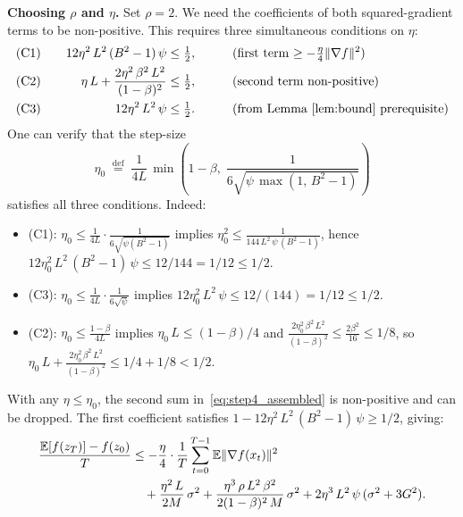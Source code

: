 \documentclass{article}
\begin{document}
\medskip
\noindent\textbf{Choosing $\rho$ and $\eta$.}
Set $\rho = 2$. We need the coefficients of both squared-gradient terms to be
non-positive. This requires three simultaneous conditions on $\eta$:
\begin{alignat}{3}
&\text{(C1)}\quad& 12\eta^2\,L^2\,(B^2-1)\,\psi &\leq \tfrac{1}{2},
  &\qquad& \text{(first term $\geq -\tfrac{\eta}{4}\|\nabla f\|^2$)} \notag\\
&\text{(C2)}\quad& \eta\,L + \frac{2\eta^2\,\beta^2\,L^2}{(1-\beta)^2}
  &\leq \tfrac{1}{2},
  &\qquad& \text{(second term non-positive)} \notag\\
&\text{(C3)}\quad& 12\eta^2\,L^2\,\psi &\leq \tfrac{1}{2}.
  &\qquad& \text{(from Lemma~\ref{lem:bound} prerequisite)}
\label{eq:three_conditions}
\end{alignat}
One can verify that the step-size
\begin{equation}
\eta_0 \;\stackrel{\text{def}}{=}\;
\frac{1}{4L}\,\min\!\left(1 - \beta,\;
\frac{1}{6\sqrt{\psi\,\max(1,\,B^2-1)}}\right)
\label{eq:eta0}
\end{equation}
satisfies all three conditions. Indeed:
\begin{itemize}
\item (C1): $\eta_0 \leq \frac{1}{4L}\cdot\frac{1}{6\sqrt{\psi(B^2-1)}}$
  implies $\eta_0^2 \leq \frac{1}{144\,L^2\,\psi\,(B^2-1)}$,
  hence $12\eta_0^2\,L^2\,(B^2-1)\,\psi \leq 12/144 = 1/12 \leq 1/2$.
\item (C3): $\eta_0 \leq \frac{1}{4L}\cdot\frac{1}{6\sqrt{\psi}}$
  implies $12\eta_0^2\,L^2\,\psi \leq 12/(144) = 1/12 \leq 1/2$.
\item (C2): $\eta_0 \leq \frac{1-\beta}{4L}$ implies $\eta_0\,L \leq (1-\beta)/4$ and
  $\frac{2\eta_0^2\,\beta^2\,L^2}{(1-\beta)^2} \leq \frac{2\beta^2}{16} \leq 1/8$,
  so $\eta_0\,L + \frac{2\eta_0^2\,\beta^2\,L^2}{(1-\beta)^2} \leq 1/4 + 1/8 < 1/2$.
\end{itemize}

With any $\eta \leq \eta_0$, the second sum in~\eqref{eq:step4_assembled} is
non-positive and can be dropped. The first coefficient satisfies
$1 - 12\eta^2\,L^2\,(B^2-1)\,\psi \geq 1/2$, giving:
\begin{align}
\frac{\mathbb{E}[f(z_T)] - f(z_0)}{T}
&\leq -\frac{\eta}{4}\cdot\frac{1}{T}\sum_{t=0}^{T-1}
  \mathbb{E}\|\nabla f(x_t)\|^2 \notag \\
&\quad+ \frac{\eta^2\,L}{2M}\,\sigma^2
  + \frac{\eta^3\,\rho\,L^2\,\beta^2}{2(1-\beta)^2\,M}\,\sigma^2
  + 2\eta^3\,L^2\,\psi\,(\sigma^2 + 3G^2).
\label{eq:pre_final}
\end{align}
\end{document}
